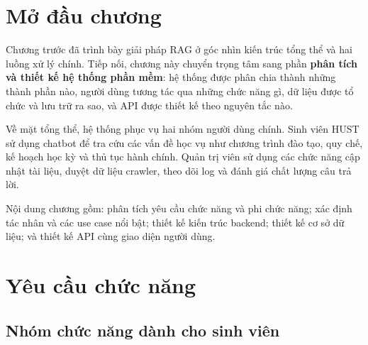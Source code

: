 \documentclass[../DoAn.tex]{subfiles}
\begin{document}
\section{Mở đầu chương}

Chương trước đã trình bày giải pháp RAG ở góc nhìn kiến trúc tổng thể và hai
luồng xử lý chính. Tiếp nối, chương này chuyển trọng tâm sang phần
\textbf{phân tích và thiết kế hệ thống phần mềm}: hệ thống được phân chia
thành những thành phần nào, người dùng tương tác qua những chức năng gì, dữ
liệu được tổ chức và lưu trữ ra sao, và API được thiết kế theo nguyên tắc nào.

Về mặt tổng thể, hệ thống phục vụ hai nhóm người dùng chính. Sinh viên HUST
sử dụng chatbot để tra cứu các vấn đề học vụ như chương trình đào tạo, quy
chế, kế hoạch học kỳ và thủ tục hành chính. Quản trị viên sử dụng các chức
năng cập nhật tài liệu, duyệt dữ liệu crawler, theo dõi log và đánh giá chất
lượng câu trả lời.

Nội dung chương gồm: phân tích yêu cầu chức năng và phi chức năng; xác định
tác nhân và các use case nổi bật; thiết kế kiến trúc backend; thiết kế cơ sở
dữ liệu; và thiết kế API cùng giao diện người dùng.

\section{Yêu cầu chức năng}

\subsection{Nhóm chức năng dành cho sinh viên}
\end{document}
